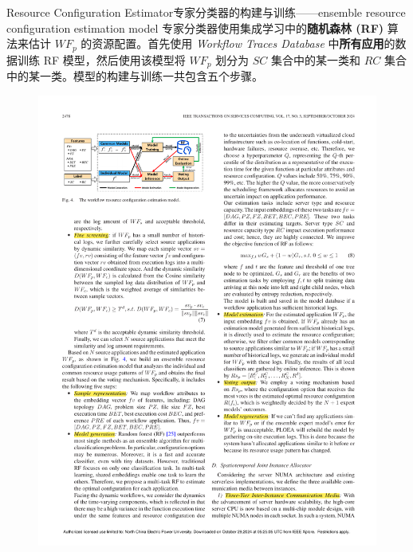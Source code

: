 \documentclass[aspectratio=169]{beamer}
\begin{document}
\begin{frame}{Resource Configuration Estimator}{专家分类器的构建与训练——ensemble resource configuration estimation model}
  专家分类器使用集成学习中的\textbf{随机森林 (RF)} 算法来估计 $WF_p$ 的资源配置。首先使用 \textit{Workflow Traces Database} 中\textbf{所有应用}的数据训练 RF 模型，然后使用该模型将 $WF_p$ 划分为 $SC$ 集合中的某一类和 $RC$ 集合中的某一类。模型的构建与训练一共包含五个步骤。
  \begin{figure}
    \centering
    \includegraphics[height=0.6\textheight]{img/method/resource-configuration-estimation-model.pdf}
  \end{figure}
\end{frame}
\end{document}
